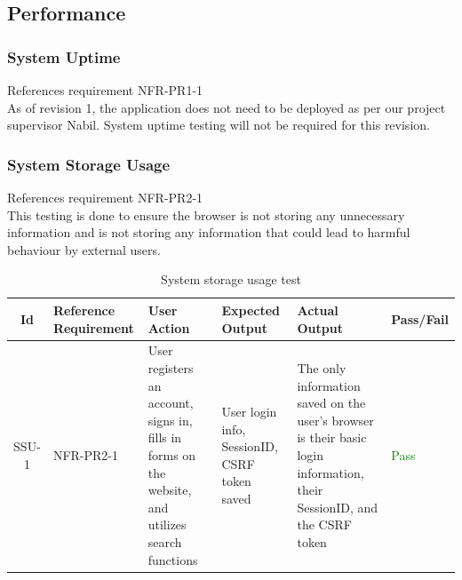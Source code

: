 \documentclass[12pt, titlepage]{article}
\begin{document}
		
\subsection{Performance}
\subsubsection{System Uptime}
References requirement NFR-PR1-1 \\


As of revision 1, the application does not need to be deployed as per our project supervisor Nabil. System uptime testing will not be required for this revision.

\subsubsection{System Storage Usage}
References requirement NFR-PR2-1\\

This testing is done to ensure the browser is not storing any unnecessary information and is not storing any information that could lead to harmful behaviour by external users.

\begin{table}[H]
    \centering
    \begin{tabularx}{\textwidth}{|c|p{2.3cm}|p{2.4cm}|p{2.5cm}|p{2.2cm}|p{2cm}|}
        \hline
        Id & Reference Requirement & User Action & Expected Output & Actual Output & Pass/Fail\\ \hline
        SSU-1 & NFR-PR2-1 & User registers an account, signs in, fills in forms on the website, and utilizes search functions & User login info, SessionID, CSRF token saved & The only information saved on the user's browser is their basic login information, their SessionID, and the CSRF token & \textcolor{green}{Pass} \\ \hline
    \end{tabularx}
    \caption{System storage usage test}
\end{table}
\end{document}
